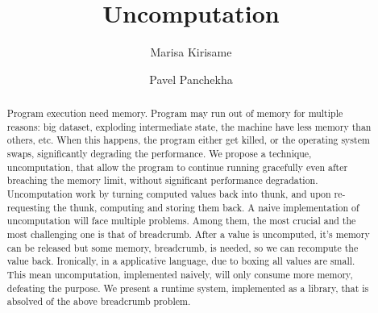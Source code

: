 \documentclass[acmsmall]{acmart}
\begin{document}
	\title{Uncomputation}
	\author{Marisa Kirisame}
	\authornotemark[1]

	\author{Pavel Panchekha}
	\email{}
	\authornotemark[1]
	
	\renewcommand{\shortauthors}{Kirisame et al.}
	\begin{abstract}
		Program execution need memory. Program may run out of memory for multiple reasons: big dataset, exploding intermediate state, the machine have less memory than others, etc. When this happens, the program either get killed, or the operating system swaps, significantly degrading the performance.
		We propose a technique, uncomputation, that allow the program to continue running gracefully even after breaching the memory limit, without significant performance degradation.
		Uncomputation work by turning computed values back into thunk, and upon re-requesting the thunk, computing and storing them back.
		A naive implementation of uncomputation will face multiple problems. Among them, the most crucial and the most challenging one is that of breadcrumb. After a value is uncomputed, it's memory can be released but some memory, breadcrumb, is needed, so we can recompute the value back.
		Ironically, in a applicative language, due to boxing all values are small. This mean uncomputation, implemented naively, will only consume more memory, defeating the purpose.
		We present a runtime system, implemented as a library, that is absolved of the above breadcrumb problem.
	\end{abstract}
	
\end{document}
